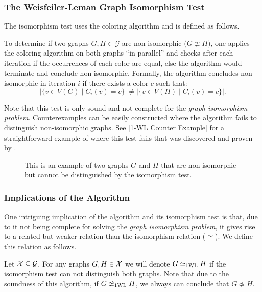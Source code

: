 \subsubsection{The Weisfeiler-Leman Graph Isomorphism Test}
The isomorphism test uses the \wl coloring algorithm and is defined as follows.

\begin{definition}
    To determine if two graphs $G, H \in \mathcal{G}$ are non-isomorphic ($G \ncong H)$, one applies the \wl coloring algorithm on both graphs ``in parallel'' and checks after each iteration if the occurrences of each color are equal, else the algorithm would terminate and conclude non-isomorphic. Formally, the algorithm concludes non-isomorphic in iteration $i$ if there exists a color $c$ such that: 
    \begin{equation*}
        |\{ v \in V(G) \mid C_i(v) = c\} | \neq |\{ v \in V(H) \mid C_i(v) = c\} |.
    \end{equation*}
\end{definition}

Note that this test is only sound and not complete for the \textit{graph isomorphism problem}. Counterexamples can be easily constructed where the algorithm fails to distinguish non-isomorphic graphs. See \autoref{1-WL Counter Example} for a straightforward example of where this test fails that was discovered and proven by \cite{Cai1992}.
\begin{figure}[H]
    \centering
    
    \caption{This is an example of two graphs $G$ and $H$ that are non-isomorphic but cannot be distinguished by the \wl isomorphism test.}
    \label{1-WL Counter Example}
\end{figure}

\subsubsection{Implications of the \wl Algorithm}
One intriguing implication of the \wl algorithm and its isomorphism test is that, due to it not being complete for solving the \textit{graph isomorphism problem}, it gives rise to a related but weaker relation than the isomorphism relation ($\simeq$). We define this relation as follows.

\begin{definition}[\wl Relation]
    Let $\mathcal{X} \subseteq \mathcal{G}$. For any graphs $G,H \in \mathcal{X}$ we will denote $G \simeq_{\text{1WL}} H$ if the \wl isomorphism test can not distinguish both graphs. Note that due to the soundness of this algorithm, if $G \not\simeq_{\text{1WL}} H$, we always can conclude that $G \not\simeq H$.
\end{definition}

